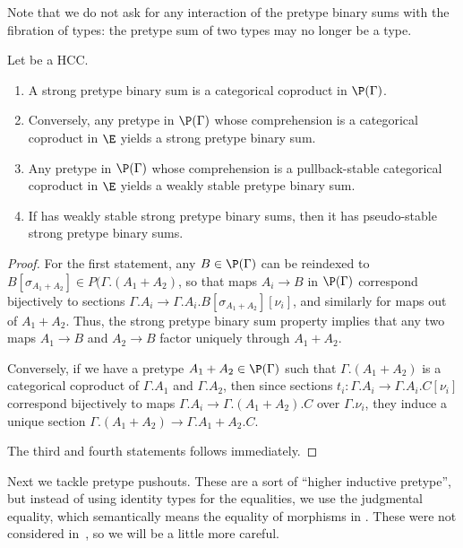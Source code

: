 \documentclass{amsart}
\begin{document}
Note that we do not ask for any interaction of the pretype binary sums with the fibration of types: the pretype sum of two types may no longer be a type.

\begin{lem}\label{thm:categorical-pretype-sums}
  Let \E be a HCC.
  \begin{enumerate}
  \item A strong pretype binary sum is a categorical coproduct in $\P(\Gamma)$.
  \item Conversely, any pretype in $\P(\Gamma)$ whose comprehension is a categorical coproduct in $\E$ yields a strong pretype binary sum.
  \item Any pretype in $\P(\Gamma)$ whose comprehension is a pullback-stable categorical coproduct in $\E$ yields a weakly stable pretype binary sum.
  \item If \E has weakly stable strong pretype binary sums, then it has pseudo-stable strong pretype binary sums.
  \end{enumerate}
\end{lem}
\begin{proof}
  For the first statement, any $B\in \P(\Gamma)$ can be reindexed to $B[\sigma_{A_1+A_2}] \in P(\Gamma.(A_1+A_2)$, so that maps $A_i \to B$ in $\P(\Gamma)$ correspond bijectively to sections $\Gamma.A_i \to \Gamma.A_i.B[\sigma_{A_1+A_2}][\nu_i]$, and similarly for maps out of $A_1+A_2$.
  Thus, the strong pretype binary sum property implies that any two maps $A_1\to B$ and $A_2\to B$ factor uniquely through $A_1+A_2$.

  Conversely, if we have a pretype $A_1+A_2 \in \P(\Gamma)$ such that $\Gamma.(A_1+A_2)$ is a categorical coproduct of $\Gamma.A_1$ and $\Gamma.A_2$, then since sections $t_i :\Gamma.A_i \to \Gamma.A_i.C[\nu_i]$ correspond bijectively to maps $\Gamma.A_i \to \Gamma.(A_1+A_2).C$ over $\Gamma.\nu_i$, they induce a unique section $\Gamma.(A_1+A_2) \to \Gamma.A_1+A_2.C$.

  The third and fourth statements follows immediately.
\end{proof}

Next we tackle pretype pushouts.
These are a sort of ``higher inductive pretype'', but instead of using identity types for the equalities, we use the judgmental equality, which semantically means the equality of morphisms in \E.
These were not considered in~\cite{lw:localuniv}, so we will be a little more careful.
\end{document}
